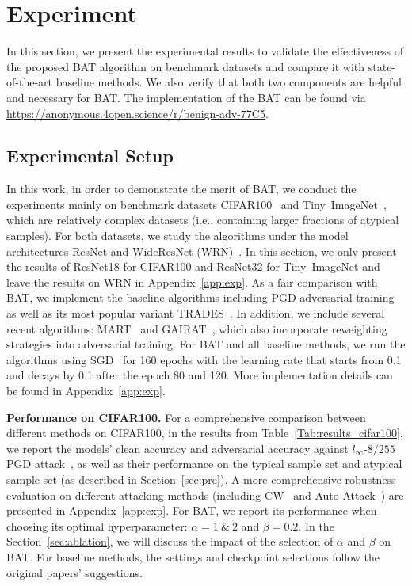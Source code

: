 
\vspace{-0.2cm}
\section{Experiment}\label{sec:exp}
\vspace{-0.2cm}
In this section, we present the experimental results to validate the effectiveness of the proposed BAT algorithm on benchmark datasets and compare it with state-of-the-art baseline methods. We also verify that both two components are helpful and necessary for BAT. The implementation of the BAT can be found via \url{https://anonymous.4open.science/r/benign-adv-77C5}.

\vspace{-0.2cm}
\subsection{Experimental Setup}
\vspace{-0.1cm}
In this work, in order to demonstrate the 
merit of BAT, we conduct the experiments mainly on benchmark datasets CIFAR100~\cite{krizhevsky2009learning} and Tiny~ImageNet~\cite{le2015tiny}, which are relatively complex datasets (i.e., containing larger fractions of atypical samples). For both datasets, we study the algorithms under the model architectures ResNet and WideResNet (WRN)~\cite{he2016deep}. In this section, we only present the results of ResNet18 for CIFAR100 and ResNet32 for Tiny~ImageNet and leave the results on WRN in Appendix~\ref{app:exp}. As a fair comparison with BAT, we implement the baseline algorithms including PGD adversarial training~\cite{madry2017towards} as well as its most popular variant TRADES~\cite{zhang2019theoretically}. In addition, we include several recent algorithms: MART~\cite{wang2019improving} and GAIRAT~\cite{zhang2020geometry}, which also incorporate reweighting strategies into adversarial training. For BAT and all baseline methods, we run the algorithms using SGD~\cite{bottou2010large} for 160 epochs with the learning rate that starts from 0.1 and decays by 0.1 after the epoch 80 and 120. More implementation details can be found in Appendix~\ref{app:exp}.

\textbf{Performance on CIFAR100.} For a comprehensive comparison between different methods on CIFAR100, in the results from Table~\ref{Tab:results_cifar100}, we report the models' clean accuracy and adversarial accuracy against $l_\infty$-$8/255$ PGD attack~\cite{madry2017towards}, as well as their performance on the typical sample set and atypical sample set (as described in Section~\ref{sec:pre}). A more comprehensive robustness evaluation on different attacking methods (including CW~\cite{carlini2017towards} and Auto-Attack~\cite{croce2020reliable}) are presented in Appendix~\ref{app:exp}. For BAT, we report its performance when choosing its optimal hyperparameter: $\alpha = 1  ~\text{\&} ~2$ and $\beta = 0.2$. In the Section~\ref{sec:ablation}, we will discuss the impact of the selection of $\alpha$ and $\beta$ on BAT. For baseline methods, the settings and checkpoint selections follow the original papers' suggestions.

